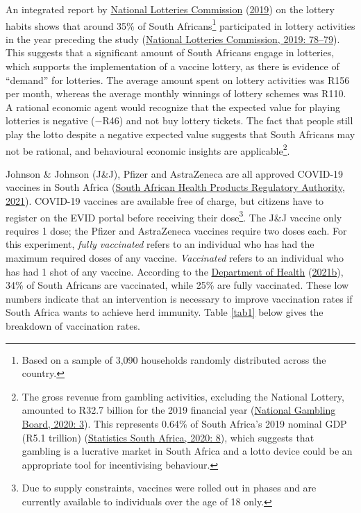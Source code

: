 \documentclass[11pt,preprint, authoryear]{elsarticle}
\numberwithin{equation}{section}
\numberwithin{figure}{section}
\numberwithin{table}{section}
\let\rmarkdownfootnote\footnote%
\def\footnote{\protect\rmarkdownfootnote}
\begin{document}
An integrated report by \protect\hyperlink{ref-lotto}{National Lotteries
Commission} (\protect\hyperlink{ref-lotto}{2019}) on the lottery habits
shows that around 35\% of South Africans\footnote{Based on a sample of
  3,090 households randomly distributed across the country.}
participated in lottery activities in the year preceding the study
(\protect\hyperlink{ref-lotto}{National Lotteries Commission, 2019:
78--79}). This suggests that a significant amount of South Africans
engage in lotteries, which supports the implementation of a vaccine
lottery, as there is evidence of ``demand'' for lotteries. The average
amount spent on lottery activities was R156 per month, whereas the
average monthly winnings of lottery schemes was R110. A rational
economic agent would recognize that the expected value for playing
lotteries is negative (\(-\)R46) and not buy lottery tickets. The fact
that people still play the lotto despite a negative expected value
suggests that South Africans may not be rational, and behavioural
economic insights are applicable\footnote{The gross revenue from
  gambling activities, excluding the National Lottery, amounted to R32.7
  billion for the 2019 financial year
  (\protect\hyperlink{ref-gamble}{National Gambling Board, 2020: 3}).
  This represents 0.64\% of South Africa's 2019 nominal GDP (R5.1
  trillion) (\protect\hyperlink{ref-statsa}{Statistics South Africa,
  2020: 8}), which suggests that gambling is a lucrative market in South
  Africa and a lotto device could be an appropriate tool for
  incentivising behaviour.}.

Johnson \& Johnson (J\&J), Pfizer and AstraZeneca are all approved
COVID-19 vaccines in South Africa (\protect\hyperlink{ref-sah}{South
African Health Products Regulatory Authority, 2021}). COVID-19 vaccines
are available free of charge, but citizens have to register on the EVID
portal before receiving their dose\footnote{Due to supply constraints,
  vaccines were rolled out in phases and are currently available to
  individuals over the age of 18 only.}. The J\&J vaccine only requires
1 dose; the Pfizer and AstraZeneca vaccines require two doses each. For
this experiment, \emph{fully vaccinated} refers to an individual who has
had the maximum required doses of any vaccine. \emph{Vaccinated} refers
to an individual who has had 1 shot of any vaccine. According to the
\protect\hyperlink{ref-stat}{Department of Health}
(\protect\hyperlink{ref-stat}{2021b}), 34\% of South Africans are
vaccinated, while 25\% are fully vaccinated. These low numbers indicate
that an intervention is necessary to improve vaccination rates if South
Africa wants to achieve herd immunity. Table \ref{tab1} below gives the
breakdown of vaccination rates.
\end{document}
